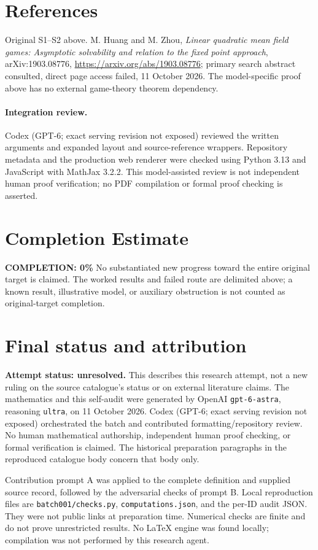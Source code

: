 \documentclass[11pt]{article}
\begin{document}
\section{References}
Original S1--S2 above. M. Huang and M. Zhou, \emph{Linear quadratic mean field games: Asymptotic solvability and relation to the fixed point approach}, arXiv:1903.08776, \url{https://arxiv.org/abs/1903.08776}; primary search abstract consulted, direct page access failed, 11 October 2026. The model-specific proof above has no external game-theory theorem dependency.


\paragraph{Integration review.} Codex (GPT-6; exact serving revision not exposed) reviewed the written arguments and expanded layout and source-reference wrappers. Repository metadata and the production web renderer were checked using Python 3.13 and JavaScript with MathJax 3.2.2. This model-assisted review is not independent human proof verification; no PDF compilation or formal proof checking is asserted.

\section{Completion Estimate}
\noindent\textbf{COMPLETION: 0\%}
No substantiated new progress toward the entire original target is claimed. The worked results and failed route are delimited above; a known result, illustrative model, or auxiliary obstruction is not counted as original-target completion.

\section{Final status and attribution}
\textbf{Attempt status: unresolved.} This describes this research attempt, not a new ruling on the source catalogue's status or on external literature claims.
The mathematics and this self-audit were generated by OpenAI \texttt{gpt-6-astra}, reasoning \texttt{ultra}, on 11 October 2026. Codex (GPT-6; exact serving revision not exposed) orchestrated the batch and contributed formatting/repository review. No human mathematical authorship, independent human proof checking, or formal verification is claimed. The historical preparation paragraphs in the reproduced catalogue body concern that body only.

Contribution prompt A was applied to the complete definition and supplied source record, followed by the adversarial checks of prompt B. Local reproduction files are \texttt{batch001/checks.py}, \texttt{computations.json}, and the per-ID audit JSON. They were not public links at preparation time. Numerical checks are finite and do not prove unrestricted results. No LaTeX engine was found locally; compilation was not performed by this research agent.
\end{document}
